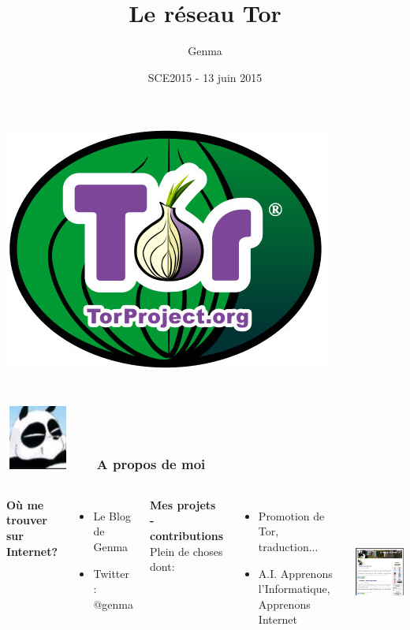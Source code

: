 \documentclass{beamer}
\title[Tor et le Tor Browser Bundle]{Le réseau Tor}
\author{Genma}
\date{SCE2015 - 13 juin 2015}
\begin{document}
\begin{frame}
	\titlepage
	\begin{center}
		\includegraphics[scale=0.2]{./images/logo_tor.jpg}
		\\		
		\\[2.5ex]
		{\tiny\CcNote{\CcLongnameByNcSa}}
		\vspace*{-2.5ex}
	\end{center}
\end{frame}

\begin{frame}
\frametitle{\includegraphics[scale=0.4]{./images/Genma.jpg} \ \ \  A propos de moi  }
\begin{columns}[c] 

\textbf{Où me trouver sur Internet?}
\begin{itemize}
\item Le Blog de Genma
\item Twitter : @genma
\end{itemize}
\textbf{Mes projets - contributions}
\\ Plein de choses dont:
\begin{itemize}
\item Promotion de Tor, traduction...
\item A.I. Apprenons l'Informatique, Apprenons Internet
\end{itemize}

\includegraphics[width=5cm,height=5cm]{./images/blog.png} 
\end{columns}
\end{frame}
\end{document}
